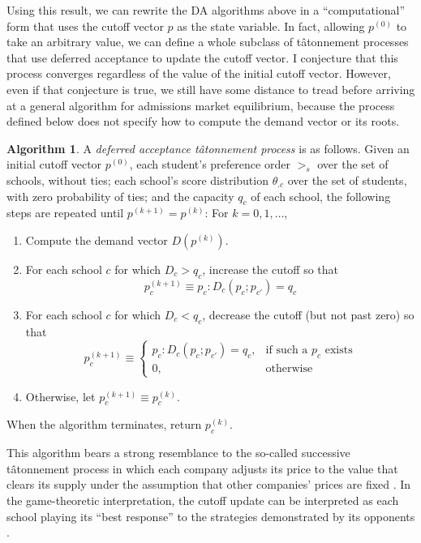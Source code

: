 \documentclass[12pt]{article}
\numberwithin{equation}{subsection}
\theoremstyle{definition}
\newtheorem{algorithm}{Algorithm}
\begin{document}
Using this result, we can rewrite the DA algorithms above in a ``computational'' form that uses the cutoff vector $p$ as the state variable. In fact, allowing $p^{(0)}$ to take an arbitrary value, we can define a whole subclass of t\^{a}tonnement processes that use deferred acceptance to update the cutoff vector. I conjecture that this process converges regardless of the value of the initial cutoff vector. However, even if that conjecture is true, we still have some distance to tread before arriving at a general algorithm for admissions market equilibrium, because the process defined below does not specify how to compute the demand vector or its roots.
\begin{algorithm}
A \emph{deferred acceptance t\^{a}tonnement process} is as follows. Given an initial cutoff vector $p^{(0)}$, each student's preference order $>_s$ over the set of schools, without ties;  each school's score distribution $\theta_{.c}$ over the set of students, with zero probability of ties; and the capacity $q_c$ of each school, the following steps are repeated until $p^{(k+1)} = p^{(k)}$: For $k = 0, 1, \dots$, 
\begin{enumerate}
\item Compute the demand vector $D (p^{(k)})$. 
\item For each school $c$ for which $D_c > q_c$, increase the cutoff so that
\[p_c^{(k+1)} \equiv p_c: D_c(p_c; p_{c'} ) = q_c\]
\item For each school $c$ for which $D_c < q_c$, decrease the cutoff (but not past zero) so that
\[p_c^{(k+1)} \equiv \begin{cases}
p_c: D_c(p_c; p_{c'} ) = q_c, &\text{if such a } p_c \text{ exists}\\
0, &\text{otherwise}
\end{cases}\]
\item Otherwise, let $p_c^{(k+1)} \equiv p_c^{(k)}$.
\end{enumerate}
When the algorithm terminates, return $p_c^{(k)}$. 
\end{algorithm}

This algorithm bears a strong resemblance to the so-called successive t\^{a}tonnement process in which each company adjusts its price to the value that clears its supply under the assumption that other companies' prices are fixed \parencite[see][equation 6]{walrastatonnement}. In the game-theoretic interpretation, the cutoff update can be interpreted as each school playing its ``best response'' to the strategies demonstrated by its opponents \parencite[][\S19.3.4]{networkformationgames}. 
\end{document}
